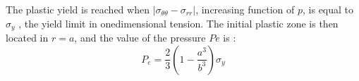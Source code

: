 The plastic yield is reached when $|\sigma_{\theta\theta} - \sigma_{rr}|$, 
increasing function of $p$, is equal to $\sigma_y$ , the yield limit
in onedimensional tension. The initial plastic zone is then located in $r=a$, 
and the value of the pressure $Pe$ is :
\[
P_e = \frac23 \left( 1 - \frac{a^3}{b^3} \right)\sigma_y
\]










